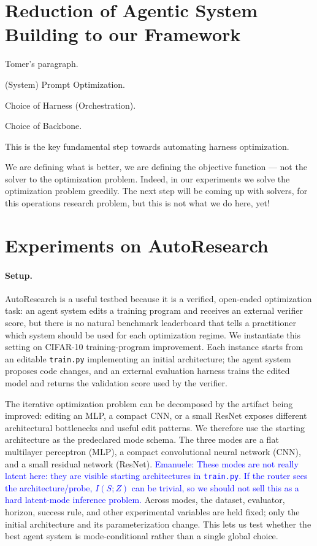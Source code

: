 \documentclass{article}
\begin{document}
\section{Reduction of Agentic System Building to our Framework}

Tomer's paragraph.

(System) Prompt Optimization.

Choice of Harness (Orchestration).

Choice of Backbone.

This is the key fundamental step towards automating harness optimization.

We are defining what is better, we are defining the objective function --- not the solver to the optimization problem. Indeed, in our experiments we solve the optimization problem greedily. The next step will be coming up with solvers, for this operations research problem, but this is not what we do here, yet!

\section{Experiments on AutoResearch}
\label{sec:experiments}

\paragraph{Setup.}
AutoResearch is a useful testbed because it is a verified, open-ended optimization task: an agent system edits a training program and receives an external verifier score, but there is no natural benchmark leaderboard that tells a practitioner which system should be used for each optimization regime.
We instantiate this setting on CIFAR-10 training-program improvement.  Each instance starts from an editable \texttt{train.py} implementing an initial architecture; the agent system proposes code changes, and an external evaluation harness trains the edited model and returns the validation score used by the verifier.

The iterative optimization problem can be decomposed by the artifact being improved: editing an MLP, a compact CNN, or a small ResNet exposes different architectural bottlenecks and useful edit patterns.
We therefore use the starting architecture as the predeclared mode schema.  The three modes are a flat multilayer perceptron (MLP), a compact convolutional neural network (CNN), and a small residual network (ResNet).
\textcolor{blue}{Emanuele: These modes are not really latent here: they are visible starting architectures in \texttt{train.py}. If the router sees the architecture/probe, \(I(S;Z)\) can be trivial, so we should not sell this as a hard latent-mode inference problem.}
Across modes, the dataset, evaluator, horizon, success rule, and other experimental variables are held fixed; only the initial architecture and its parameterization change.
This lets us test whether the best agent system is mode-conditional rather than a single global choice.
\end{document}
